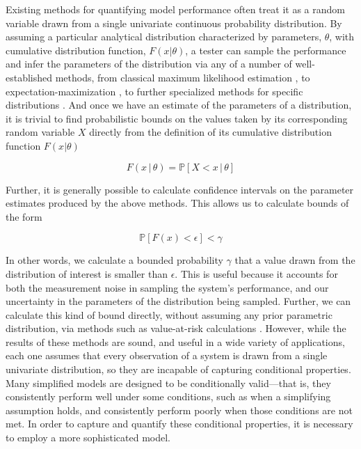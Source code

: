 \documentclass[letterpaper, 10 pt, conference]{ieeeconf}  %
\begin{document}
Existing methods for quantifying model performance often treat it as a random variable drawn from a single univariate continuous probability distribution. By assuming a particular analytical distribution characterized by parameters, $\theta$, with cumulative distribution function, $F(x|\theta)$, a tester can sample the performance and infer the parameters of the distribution via any of a number of well-established methods, from classical maximum likelihood estimation \cite{gelman13}, to expectation-maximization \cite{dempster77}, to further specialized methods for specific distributions \cite{tang19,ren22}. And once we have an estimate of the parameters of a distribution, it is trivial to find probabilistic bounds on the values taken by its corresponding random variable $X$ directly from the definition of its cumulative distribution function $F(x|\theta)$

\begin{equation}
    F(x\,|\,\theta) = \mathbb{P}[X<x\,|\,\theta] \nonumber
\end{equation}

Further, it is generally possible to calculate confidence intervals on the parameter estimates produced by the above methods. This allows us to calculate bounds of the form

\begin{equation}
    \mathbb{P}[F(x)<\epsilon]<\gamma \nonumber
\end{equation}

In other words, we calculate a bounded probability $\gamma$ that a value drawn from the distribution of interest is smaller than $\epsilon$. This is useful because it accounts for both the measurement noise in sampling the system's performance, and our uncertainty in the parameters of the distribution being sampled. Further, we can calculate this kind of bound directly, without assuming any prior parametric distribution, via methods such as value-at-risk calculations \cite{jorion06,kuester06}. However, while the results of these methods are sound, and useful in a wide variety of applications, each one assumes that every observation of a system is drawn from a single univariate distribution, so they are incapable of capturing conditional properties. Many simplified models are designed to be conditionally valid---that is, they consistently perform well under some conditions, such as when a simplifying assumption holds, and consistently perform poorly when those conditions are not met. In order to capture and quantify these conditional properties, it is necessary to employ a more sophisticated model.
\newline
\end{document}
